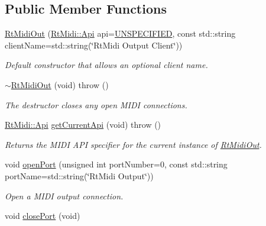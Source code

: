 \subsection*{Public Member Functions}
\begin{DoxyCompactItemize}
\item 
\hyperlink{class_rt_midi_out_a2940966e36b5479fbbf82c07424318cc}{Rt\+Midi\+Out} (\hyperlink{class_rt_midi_aac66af04a85fe5c5f07c360574a19406}{Rt\+Midi\+::\+Api} api=\hyperlink{class_rt_midi_aac66af04a85fe5c5f07c360574a19406a4a4d9f7a38a082d6b0d5dd2b5de94ab9}{U\+N\+S\+P\+E\+C\+I\+F\+I\+ED}, const std\+::string client\+Name=std\+::string(\char`\"{}Rt\+Midi Output Client\char`\"{}))
\begin{DoxyCompactList}\small\item\em Default constructor that allows an optional client name. \end{DoxyCompactList}\item 
\hyperlink{class_rt_midi_out_afdc37ccd60d7a31b3970da7a1d423881}{$\sim$\+Rt\+Midi\+Out} (void)  throw ()\hypertarget{class_rt_midi_out_afdc37ccd60d7a31b3970da7a1d423881}{}\label{class_rt_midi_out_afdc37ccd60d7a31b3970da7a1d423881}

\begin{DoxyCompactList}\small\item\em The destructor closes any open M\+I\+DI connections. \end{DoxyCompactList}\item 
\hyperlink{class_rt_midi_aac66af04a85fe5c5f07c360574a19406}{Rt\+Midi\+::\+Api} \hyperlink{class_rt_midi_out_a532b5712e305bd8afb65a3ad14138e0f}{get\+Current\+Api} (void)  throw ()\hypertarget{class_rt_midi_out_a532b5712e305bd8afb65a3ad14138e0f}{}\label{class_rt_midi_out_a532b5712e305bd8afb65a3ad14138e0f}

\begin{DoxyCompactList}\small\item\em Returns the M\+I\+DI A\+PI specifier for the current instance of \hyperlink{class_rt_midi_out}{Rt\+Midi\+Out}. \end{DoxyCompactList}\item 
void \hyperlink{class_rt_midi_out_a1b280d67317cd473a8816aeb2fe6c186}{open\+Port} (unsigned int port\+Number=0, const std\+::string port\+Name=std\+::string(\char`\"{}Rt\+Midi Output\char`\"{}))
\begin{DoxyCompactList}\small\item\em Open a M\+I\+DI output connection. \end{DoxyCompactList}\item 
void \hyperlink{class_rt_midi_out_a5a28d1ba9e002fd07a317d3a257d87e8}{close\+Port} (void)\hypertarget{class_rt_midi_out_a5a28d1ba9e002fd07a317d3a257d87e8}{}\label{class_rt_midi_out_a5a28d1ba9e002fd07a317d3a257d87e8}


\end{DoxyCompactItemize}
